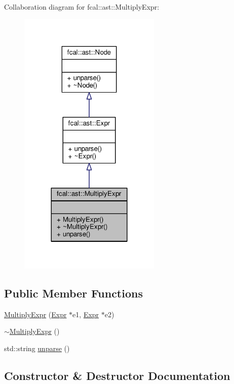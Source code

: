 Collaboration diagram for fcal\+:\+:ast\+:\+:Multiply\+Expr\+:
\nopagebreak
\begin{figure}[H]
\begin{center}
\leavevmode
\includegraphics[width=192pt]{classfcal_1_1ast_1_1MultiplyExpr__coll__graph}
\end{center}
\end{figure}
\subsection*{Public Member Functions}
\begin{DoxyCompactItemize}
\item 
\hyperlink{classfcal_1_1ast_1_1MultiplyExpr_a548744b36bc8325486d2d474c5141090}{Multiply\+Expr} (\hyperlink{classfcal_1_1ast_1_1Expr}{Expr} $\ast$e1, \hyperlink{classfcal_1_1ast_1_1Expr}{Expr} $\ast$e2)
\item 
\hyperlink{classfcal_1_1ast_1_1MultiplyExpr_a6bba0065de4fee7616d36291ba016be9}{$\sim$\+Multiply\+Expr} ()
\item 
std\+::string \hyperlink{classfcal_1_1ast_1_1MultiplyExpr_a95d9a65fb0f15fea8d94156f64979ca3}{unparse} ()
\end{DoxyCompactItemize}


\subsection{Constructor \& Destructor Documentation}
